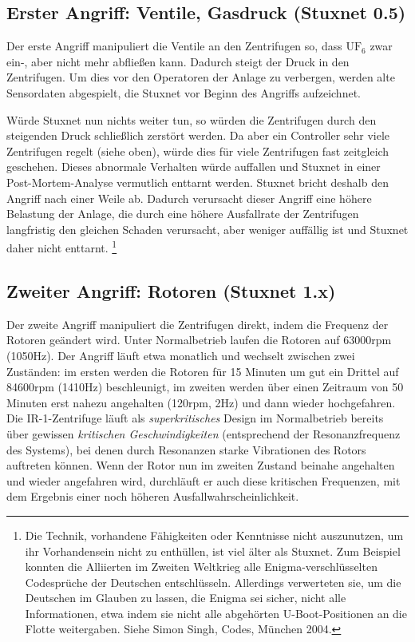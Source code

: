 \documentclass[a4paper]{article}
\begin{document}
\subsection{Erster Angriff: Ventile, Gasdruck (Stuxnet 0.5)}

Der erste Angriff manipuliert die Ventile an den Zentrifugen so,
dass $\mathrm{UF}_6$ zwar ein-, aber nicht mehr abfließen kann.
Dadurch steigt der Druck in den Zentrifugen.
Um dies vor den Operatoren der Anlage zu verbergen,
werden alte Sensordaten abgespielt, die Stuxnet vor Beginn des Angriffs aufzeichnet.

Würde Stuxnet nun nichts weiter tun, so würden die Zentrifugen durch den steigenden Druck schließlich zerstört werden.
Da aber ein Controller sehr viele Zentrifugen regelt (siehe oben), würde dies für viele Zentrifugen fast zeitgleich geschehen.
Dieses abnormale Verhalten würde auffallen und Stuxnet in einer Post-Mortem-Analyse vermutlich enttarnt werden.
Stuxnet bricht deshalb den Angriff nach einer Weile ab.
Dadurch verursacht dieser Angriff eine höhere Belastung der Anlage,
die durch eine höhere Ausfallrate der Zentrifugen langfristig den gleichen Schaden verursacht,
aber weniger auffällig ist und Stuxnet daher nicht enttarnt.
\footnote{
  Die Technik, vorhandene Fähigkeiten oder Kenntnisse nicht auszunutzen, um ihr Vorhandensein nicht zu enthüllen, ist viel älter als Stuxnet.
  Zum Beispiel konnten die Alliierten im Zweiten Weltkrieg alle Enigma-verschlüsselten Codesprüche der Deutschen entschlüsseln.
  Allerdings verwerteten sie, um die Deutschen im Glauben zu lassen, die Enigma sei sicher, nicht alle Informationen,
  etwa indem sie nicht alle abgehörten U-Boot-Positionen an die Flotte weitergaben. Siehe Simon Singh, Codes, München 2004.
}

\subsection{Zweiter Angriff: Rotoren (Stuxnet 1.x)}

Der zweite Angriff manipuliert die Zentrifugen direkt, indem die Frequenz der Rotoren geändert wird.
Unter Normalbetrieb laufen die Rotoren auf 63000rpm (1050Hz).
Der Angriff läuft etwa monatlich und wechselt zwischen zwei Zu\-stän\-den:
im ersten werden die Rotoren für 15 Minuten um gut ein Drittel auf 84600rpm (1410Hz) beschleunigt,
im zweiten werden über einen Zeitraum von 50 Minuten erst nahezu angehalten (120rpm, 2Hz) und dann wieder hochgefahren.
Die IR-1-Zentrifuge läuft als \emph{superkritisches} Design im Normalbetrieb bereits über gewissen \emph{kritischen Geschwindigkeiten}
(entsprechend der Resonanzfrequenz des Systems), bei denen durch Resonanzen starke Vibrationen des Rotors auftreten können.
Wenn der Rotor nun im zweiten Zustand beinahe angehalten und wieder angefahren wird,
durchläuft er auch diese kritischen Frequenzen, mit dem Ergebnis einer noch höheren Ausfallwahrscheinlichkeit.
\end{document}

